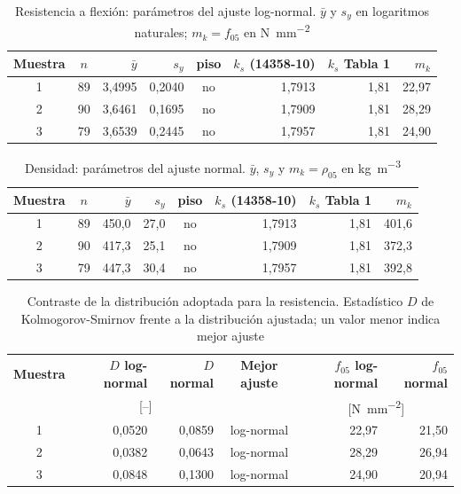 \documentclass[11pt,a4paper]{article}
\begin{document}
\begin{table}[H]
\centering
\caption[Resistencia a flexión: parámetros del ajuste log-normal]{Resistencia a flexión: parámetros del ajuste log-normal. $\bar{y}$ y $s_{y}$ en logaritmos naturales; $m_{k} = f_{05}$ en \si{\newton\per\square\milli\meter}}
\begin{tabular}{c c r r c r r r}
\toprule
\textbf{Muestra} & \textbf{$n$} & \textbf{$\bar{y}$} & \textbf{$s_{y}$} & \textbf{piso} & \textbf{$k_{s}$ (14358-10)} & \textbf{$k_{s}$ Tabla 1} & \textbf{$m_{k}$} \\
\midrule
1 & 89 & 3,4995 & 0,2040 & no & 1,7913 & 1,81 & 22,97 \\
2 & 90 & 3,6461 & 0,1695 & no & 1,7909 & 1,81 & 28,29 \\
3 & 79 & 3,6539 & 0,2445 & no & 1,7957 & 1,81 & 24,90 \\
\bottomrule
\end{tabular}
\end{table}

\begin{table}[H]
\centering
\caption[Densidad: parámetros del ajuste normal]{Densidad: parámetros del ajuste normal. $\bar{y}$, $s_{y}$ y $m_{k} = \rho_{05}$ en \si{\kilo\gram\per\cubic\meter}}
\begin{tabular}{c c r r c r r r}
\toprule
\textbf{Muestra} & \textbf{$n$} & \textbf{$\bar{y}$} & \textbf{$s_{y}$} & \textbf{piso} & \textbf{$k_{s}$ (14358-10)} & \textbf{$k_{s}$ Tabla 1} & \textbf{$m_{k}$} \\
\midrule
1 & 89 & 450,0 & 27,0 & no & 1,7913 & 1,81 & 401,6 \\
2 & 90 & 417,3 & 25,1 & no & 1,7909 & 1,81 & 372,3 \\
3 & 79 & 447,3 & 30,4 & no & 1,7957 & 1,81 & 392,8 \\
\bottomrule
\end{tabular}
\end{table}

\begin{table}[H]
\centering
\caption[Contraste de la distribución adoptada para la resistencia]{Contraste de la distribución adoptada para la resistencia. Estadístico $D$ de Kolmogorov-Smirnov frente a la distribución ajustada; un valor menor indica mejor ajuste}
\begin{tabular}{c r r c r r}
\toprule
\textbf{Muestra} & \textbf{$D$ log-normal} & \textbf{$D$ normal} & \textbf{Mejor ajuste} & \textbf{$f_{05}$ log-normal} & \textbf{$f_{05}$ normal} \\
 & \multicolumn{2}{c}{[--]} & & \multicolumn{2}{c}{[\si{\newton\per\square\milli\meter}]} \\
\midrule
1 & 0,0520 & 0,0859 & log-normal & 22,97 & 21,50 \\
2 & 0,0382 & 0,0643 & log-normal & 28,29 & 26,94 \\
3 & 0,0848 & 0,1300 & log-normal & 24,90 & 20,94 \\
\bottomrule
\end{tabular}
\end{table}
\end{document}
